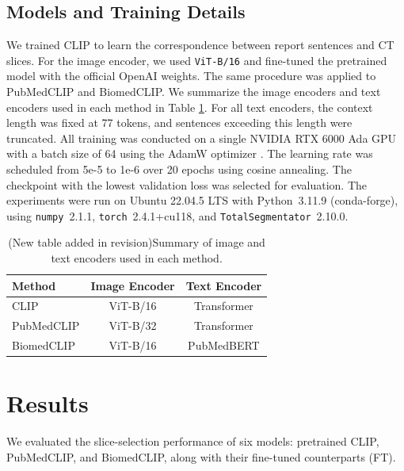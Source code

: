 \documentclass[bioengineering,article,submit,pdftex,moreauthors]{Definitions/mdpi}
\begin{document}
\subsection{Models and Training Details}
We trained CLIP to learn the correspondence between report sentences and CT slices. 
For the image encoder, we used \texttt{ViT-B/16} and fine-tuned the pretrained model with the official OpenAI weights. 
The same procedure was applied to PubMedCLIP and BiomedCLIP. We summarize the image encoders and text encoders used in each method in Table \ref{tab:model_summary}.
For all text encoders, the context length was fixed at 77 tokens, and sentences exceeding this length were truncated.
All training was conducted on a single NVIDIA RTX 6000 Ada GPU with a batch size of 64 using the AdamW optimizer \cite{loshchilov_fixing_2017}. 
The learning rate was scheduled from 5e-5 to 1e-6 over 20 epochs using cosine annealing. 
The checkpoint with the lowest validation loss was selected for evaluation.
The experiments were run on Ubuntu 22.04.5 LTS with Python~3.11.9 (conda-forge), using \texttt{numpy}~2.1.1, \texttt{torch}~2.4.1+cu118, and \texttt{TotalSegmentator}~2.10.0.

\begin{table}[ht]
  \centering
  \caption{(New table added in revision)Summary of image and text encoders used in each method.}
  \label{tab:model_summary}
  \begin{tabular}{lcc}
    \toprule
    Method                  & Image Encoder      & Text Encoder      \\
    \midrule
    CLIP                    & ViT-B/16          & Transformer       \\
    PubMedCLIP              & ViT-B/32          & Transformer       \\
    BiomedCLIP              & ViT-B/16          & PubMedBERT        \\
    \bottomrule
  \end{tabular}
\end{table}


\section{Results}

We evaluated the slice-selection performance of six models: pretrained CLIP, PubMedCLIP, and BiomedCLIP, along with their fine-tuned counterparts (FT). 
\end{document}
